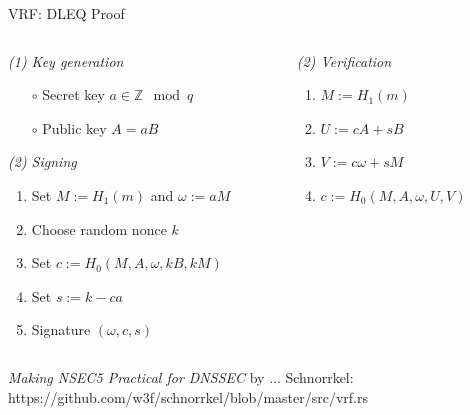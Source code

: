 \documentclass[fleqn,xcolor={usenames,dvipsnames},notes,aspectratio=169]{beamer} %
\begin{document}
\begin{frame}{VRF: DLEQ Proof}
  
  \begin{columns}
   \begin{column}{0.5\textwidth}
    {\em (1) Key generation} \\
    \begin{itemize}
    \item[$\circ$] Secret key $a \in \mathbb{Z} \mod q$
    \item[$\circ$] Public key $A = a B$ 
    \end{itemize}
    \bigskip
    {\em (2) Signing} \\
    \begin{enumerate}
    \item Set $M := H_1(m)$ and $\omega := a M$
    \item Choose random nonce $k$
    \item Set $c := H_0(M, A, \omega, k B, k M)$
    \item Set $s := k - c a$
    \item Signature $(\omega,c,s)$
    \end{enumerate}
  \end{column}
   \begin{column}{0.5\textwidth}
    {\em (2) Verification} \\
    \begin{enumerate}
    \item $M := H_1(m)$ 
    \item $U := c A + s B$
    \item $V := c \omega + s M$
    \item $c := H_0(M, A, \omega, U, V)$
    \end{enumerate}
   \end{column}
  \end{columns}
  \bigskip
  {\it Making NSEC5 Practical for DNSSEC} by ...
  Schnorrkel:  https://github.com/w3f/schnorrkel/blob/master/src/vrf.rs
 
 \end{frame}


\def\rh{\textcolor{red}{h}}
\def\yh{}
\end{document}
